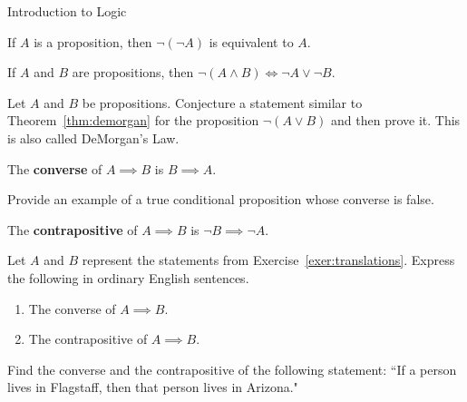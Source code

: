 \begin{section}{Introduction to Logic}
\begin{theorem}
If $A$ is a proposition, then $\neg(\neg A)$ is equivalent to $A$.
\end{theorem}

\begin{theorem}\label{thm:demorgan}
If $A$ and $B$ are propositions, then $\neg(A \wedge B) \iff \neg A \vee \neg B$.
\end{theorem}

\begin{problem}
Let $A$ and $B$ be propositions.  Conjecture a statement similar to Theorem~\ref{thm:demorgan} for the proposition $\neg(A\vee B)$ and then prove it. This is also called DeMorgan's Law.
\end{problem}

\begin{definition}\label{def:converse}
The \textbf{converse} of $A \implies B$ is $B \implies A$.
\end{definition}

\begin{exercise}
Provide an example of a true conditional proposition whose converse is false.
\end{exercise}

\begin{definition}
The \textbf{contrapositive} of $A \implies B$ is $\neg B \implies \neg A$.
\end{definition}

\begin{exercise}
Let $A$ and $B$ represent the statements from Exercise~\ref{exer:translations}.  Express the following in ordinary English sentences.
\begin{enumerate}[label=\textrm{(\alph*)}]
\item The converse of $A \implies B$.
\item The contrapositive of $A \implies B$.
\end{enumerate}
\end{exercise}

\begin{exercise}
Find the converse and the contrapositive of the following statement: ``If a person lives in Flagstaff, then that person lives in Arizona."
\end{exercise}


\end{section}
